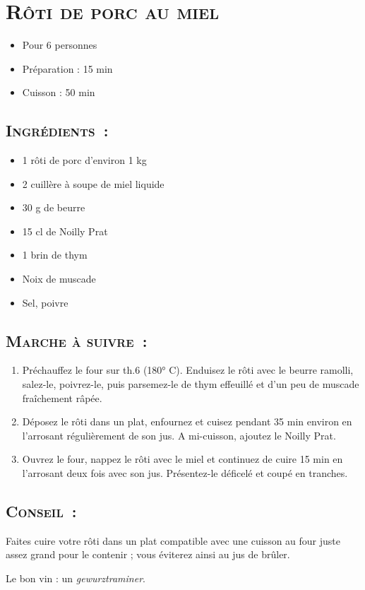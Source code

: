 \section[\normalsize{R\^oti de porc au miel}]{\LARGE{\textsc{R\^oti de porc au miel}}}


\begin{itemize}
\item Pour 6 personnes
\item Préparation : 15 min	
\item Cuisson : 50 min
\end{itemize}
\subsection*{\textsc{Ingr\'edients~:}}

\begin{itemize}
\item 1 rôti de porc d’environ 1 kg
\item 2 cuill\`ere \`a soupe de miel liquide
\item	30 g de beurre
\item	15 cl de Noilly Prat
\item 1 brin de thym
\item Noix de muscade
\item Sel, poivre
\end{itemize}


\subsection*{\textsc{Marche \`a suivre~:}}

\begin{enumerate}
\item Pr\'echauffez le four sur th.6 (180° C). Enduisez le r\^oti avec le beurre ramolli, salez-le, poivrez-le, puis parsemez-le de thym effeuill\'e et d’un peu de muscade fra\^ichement  r\^ap\'ee.

\item D\'eposez le r\^oti dans un plat, enfournez et cuisez pendant 35 min environ en l’arrosant régulièrement de son jus. A mi-cuisson, ajoutez le Noilly Prat.

\item Ouvrez le four, nappez le r\^oti avec le miel et continuez de cuire 15 min en l’arrosant deux fois avec son jus. Présentez-le d\'eficel\'e et coup\'e en tranches.
\end{enumerate}


\subsection*{\textsc{Conseil~:}}

Faites cuire votre r\^oti dans un plat compatible avec une cuisson au four juste assez grand pour le contenir ; vous \'eviterez ainsi au jus de br\^uler.

Le bon vin : un \emph{gewurztraminer}.
